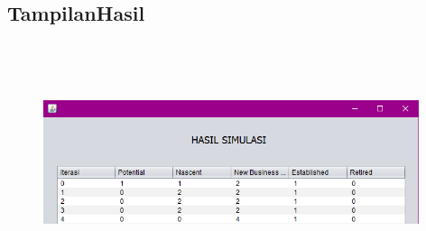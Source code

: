 \subsection{TampilanHasil}

\begin{figure} [H]
	\centering  
	\includegraphics[width=11cm, height=7cm]{tampilanHasil1} 
	\label{fig:tampilanHasil} 
\end{figure}

